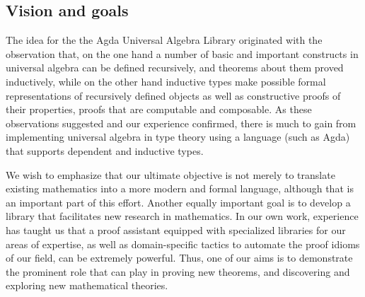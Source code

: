 \documentclass[a4paper,UKenglish,cleveref, autoref, thm-restate]{lipics-v2019}
\begin{document}
\subsection{Vision and goals}\label{vision-and-goals}
The idea for the the Agda Universal Algebra Library originated with the observation that, on the one hand a number of basic and important constructs in universal algebra can be defined recursively, and theorems about them proved inductively, while on the other hand inductive types make possible formal representations of recursively defined objects as well as constructive proofs of their properties, proofs that are computable and composable. As these observations suggested and our experience confirmed, there is much to gain from implementing universal algebra in type theory using a language (such as Agda) that supports dependent and inductive types.


We wish to emphasize that our ultimate objective is not merely to translate existing mathematics into a more modern and formal language, although that is an important part of this effort.  Another equally important goal is to develop a library that facilitates new research in mathematics. In our own work, experience has taught us that a proof assistant equipped with specialized libraries for our areas of expertise, as well as domain-specific tactics to automate the proof idioms of our field, can be extremely powerful.  Thus, one of our aims is to demonstrate the prominent role that \agdaualib can play in proving new theorems, and discovering and exploring new mathematical theories.
\end{document}
